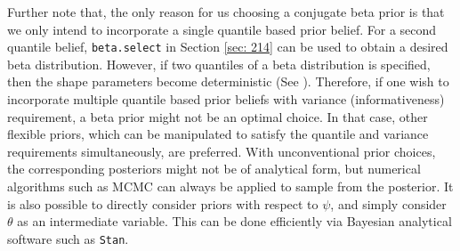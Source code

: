 \documentclass[12pt]{amsart}
\begin{document}
Further note that, the only reason for us choosing a conjugate beta prior is that we only intend to incorporate a single quantile based prior belief. For a second quantile belief, \texttt{beta.select} in Section \ref{sec: 214} can be used to obtain a desired beta distribution. However, if two quantiles of a beta distribution is specified, then the shape parameters become deterministic (See \cite{two-quantiles}). Therefore, if one wish to incorporate multiple quantile based prior beliefs with variance (informativeness) requirement, a beta prior might not be an optimal choice. In that case, other flexible priors, which can be manipulated to satisfy the quantile and variance requirements simultaneously, are preferred. With unconventional prior choices, the corresponding posteriors might not be of analytical form, but numerical algorithms such as MCMC can always be applied to sample from the posterior. It is also possible to directly consider priors with respect to $\psi$, and simply consider $\theta$ as an intermediate variable. This can be done efficiently via Bayesian analytical software such as \texttt{Stan}.
\end{document}
